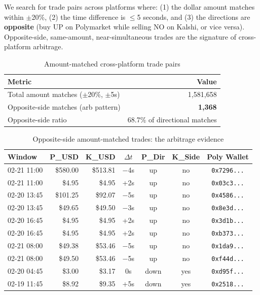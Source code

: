 \documentclass[11pt,a4paper]{article}
\begin{document}
We search for trade pairs across platforms where: (1) the dollar amount matches within $\pm$20\%, (2) the time difference is $\leq$5 seconds, and (3) the directions are \textbf{opposite} (buy UP on Polymarket while selling NO on Kalshi, or vice versa). Opposite-side, same-amount, near-simultaneous trades are the signature of cross-platform arbitrage.

\begin{table}[H]
\centering
\caption{Amount-matched cross-platform trade pairs}
\label{tab:amount_match}
\begin{tabular}{@{}lr@{}}
\toprule
\textbf{Metric} & \textbf{Value} \\
\midrule
Total amount matches ($\pm$20\%, $\pm$5s) & 1,581,658 \\
Opposite-side matches (arb pattern) & \textbf{1,368} \\
Opposite-side ratio & 68.7\% of directional matches \\
\bottomrule
\end{tabular}
\end{table}

\begin{table}[H]
\centering
\caption{Opposite-side amount-matched trades: the arbitrage evidence}
\label{tab:arb_examples}
\footnotesize
\begin{tabular}{@{}lrrcccc@{}}
\toprule
\textbf{Window} & \textbf{P\_USD} & \textbf{K\_USD} & \textbf{$\Delta t$} & \textbf{P\_Dir} & \textbf{K\_Side} & \textbf{Poly Wallet} \\
\midrule
02-21 11:00 & \$580.00 & \$513.81 & $-$4s & up & no & \texttt{0x7296...} \\
02-21 11:00 & \$4.95 & \$4.95 & +2s & up & no & \texttt{0x03c3...} \\
02-20 13:45 & \$101.25 & \$92.07 & $-$5s & up & no & \texttt{0x4586...} \\
02-20 13:45 & \$49.65 & \$49.50 & $-$3s & up & no & \texttt{0x8e3d...} \\
02-20 16:45 & \$4.95 & \$4.95 & +2s & up & no & \texttt{0x3d1b...} \\
02-20 16:45 & \$4.95 & \$4.95 & +2s & up & no & \texttt{0xb373...} \\
02-21 08:00 & \$49.38 & \$53.46 & $-$5s & up & no & \texttt{0x1da9...} \\
02-21 08:00 & \$49.50 & \$53.46 & $-$5s & up & no & \texttt{0xf44d...} \\
02-20 04:45 & \$3.00 & \$3.17 & 0s & down & yes & \texttt{0xd95f...} \\
02-19 11:45 & \$8.92 & \$9.35 & +5s & down & yes & \texttt{0x2518...} \\
\bottomrule
\end{tabular}
\end{table}
\end{document}
